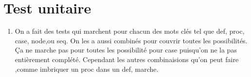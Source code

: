 \documentclass{article}
\begin{document}
\section*{Test unitaire}
\begin{enumerate}
    \item On a fait des tests qui marchent pour chacun des mots clés tel que def, proc, case, node,ou seq. On les a aussi combinés pour couvrir toutes les possibilités. Ça ne marche pas pour toutes les possibilité pour case puisqu'on ne la pas entièrement complété.  Cependant les autres combinaisions qu'on peut faire ,comme imbriquer un proc dans un def, marche.
    
\end{enumerate}
\end{document}
